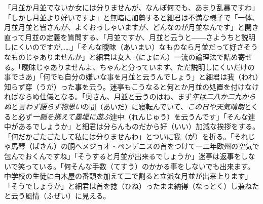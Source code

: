 \documentclass{book}
\begin{document}
「月並か月並でないか女には分りませんが、なんぼ何でも、あまり乱暴ですわ」「しかし月並より好いですよ」と無暗に加勢すると細君は不満な様子で「一体、月並月並と皆さんが、よくおっしゃいますが、どんなのが月並なんです」と開き直って月並の定義を質問する、「月並ですか、月並と云うと――さようちと説明しにくいのですが\ldots{}\ldots{}」「そんな曖昧（あいまい）なものなら月並だって好さそうなものじゃありませんか」と細君は女人（にょにん）一流の論理法で詰め寄せる。「曖昧じゃありませんよ、ちゃんと分っています、ただ説明しにくいだけの事でさあ」「何でも自分の嫌いな事を月並と云うんでしょう」と細君は我（われ）知らず穿（うが）った事を云う。迷亭もこうなると何とか月並の処置を付けなければならぬ仕儀となる。「奥さん、月並と云うのはね、まず\emph{年は二八か二九からぬ}と\emph{言わず語らず物思い}の間（あいだ）に寝転んでいて、\emph{この日や天気晴朗}とくると必ず\emph{一瓢を携えて墨堤に遊ぶ}連中（れんじゅう）を云うんです」「そんな連中があるでしょうか」と細君は分らんものだから好（いい）加減な挨拶をする。「何だかごたごたして私には分りませんわ」とついに我（が）を折る。「それじゃ馬琴（ばきん）の胴へメジョオ・ペンデニスの首をつけて一二年欧州の空気で包んでおくんですね」「そうすると月並が出来るでしょうか」迷亭は返事をしないで笑っている。「何そんな手数（てすう）のかかる事をしないでも出来ます。中学校の生徒に白木屋の番頭を加えて二で割ると立派な月並が出来上ります」「そうでしょうか」と細君は首を捻（ひね）ったまま納得（なっとく）し兼ねたと云う風情（ふぜい）に見える。
\end{document}
